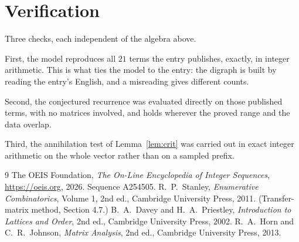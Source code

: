 \documentclass[11pt,a4paper]{article}
\theoremstyle{plain}
\theoremstyle{definition}
\begin{document}
\section{Verification}

Three checks, each independent of the algebra above.

First, the model reproduces all $21$ terms the entry publishes, exactly, in integer
arithmetic. This is what ties the model to the entry: the digraph is built by reading the
entry's English, and a misreading gives different counts.

Second, the conjectured recurrence was evaluated directly on those published terms, with no
matrices involved, and holds wherever the proved range and the data overlap.

Third, the annihilation test of Lemma~\ref{lem:crit} was carried out in exact integer
arithmetic on the whole vector rather than on a sampled prefix.

\begin{thebibliography}{9}
 The OEIS Foundation, \emph{The On-Line Encyclopedia of Integer
Sequences}, \url{https://oeis.org}, 2026. Sequence A254505.
 R.~P.~Stanley, \emph{Enumerative Combinatorics}, Volume 1, 2nd ed.,
Cambridge University Press, 2011. (Transfer-matrix method, Section 4.7.)
 B.~A.~Davey and H.~A.~Priestley, \emph{Introduction to Lattices and
Order}, 2nd ed., Cambridge University Press, 2002.
 R.~A.~Horn and C.~R.~Johnson, \emph{Matrix Analysis}, 2nd ed., Cambridge
University Press, 2013.
\end{thebibliography}
\end{document}
